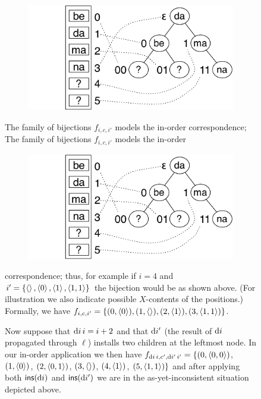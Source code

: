 \begin{figure}
\ifdissertation
    \begin{figure}
    \includegraphics[scale=.32]{images/restruct2.pdf}
    \end{figure}
    The family of bijections $f_{i,c,i'}$ models the in-order correspondence;
\else
    The family of bijections $f_{i,c,i'}$ models the in-order
    \begin{figure}
    \hspace*{-4.3em}\includegraphics[scale=.32]{images/restruct2.pdf}
    \end{figure}
    correspondence;
\fi
thus, for example if $i=4$ and $i'=\{\left<\right>, \left<0\right>, \left<1\right>,
\left<1,1\right>\}$ the bijection
would be as shown above. (For illustration we also indicate possible
$X$-contents of the positions.)
%
Formally, we have $f_{i,c,i'} = \{(0,\left<0\right>), (1,\left<\right>),
(2,\left<1\right>), (3,\left<1,1\right>)\}$.

Now suppose that $\textrm{d} i\, i = i+2$ and that $\textrm{d} i'$ (the result of $\textrm{d} i$ propagated
through $\ell$) installs two children at the leftmost node. 
%
In our in-order application we then have $f_{\textrm{d} i\, i, c', \textrm{d} i'\, i'} =
\{(0,\left<0,0\right>)$, $(1,\left<0\right>)$,
$(2,\left<0,1\right>)$, $(3,\left<\right>)$, $(4,\left<1\right>)$,
$(5,\left<1,1\right>)\}$ and
after applying both $\mathsf{ins}(\textrm{d} i)$ and $\mathsf{ins}(\textrm{d} i')$ we are in the
as-yet-inconsistent situation depicted above.


\end{figure}
